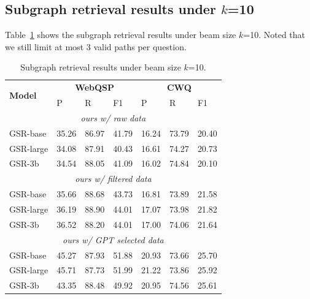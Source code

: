 \documentclass[11pt]{article}
\begin{document}
\subsection{Subgraph retrieval results under $k$=10}
\label{app:top10}
Table~\ref{tab:subgraph_ret_res_top10} shows the subgraph retrieval results under beam size $k$=10. Noted that we still limit at most 3 valid paths per question.
\begin{table}[t]
    \centering
    \small
    \begin{tabular}{l|p{0.5cm}p{0.5cm}p{0.6cm}|p{0.5cm}p{0.5cm}p{0.5cm}}
    \toprule
        \multirow{2}{*}{\bf{Model}} & \multicolumn{3}{c}{\bf{WebQSP}} & \multicolumn{3}{|c}{\bf{CWQ}} \\ 
        & P & R & F1 & P & R & F1 \\ \midrule
        \multicolumn{7}{c}{\textit{ours w/ raw data}} \\ \midrule
        GSR-base & 35.26 & 86.97 & 41.79 & 16.24 & 73.79 & 20.40 \\
        GSR-large & 34.08 & 87.91 & 40.43 & 16.61 & 74.27 & 20.73 \\
        GSR-3b & 34.54 & 88.05 & 41.09 & 16.02 & 74.84 & 20.10 \\ \midrule 
        \multicolumn{7}{c}{\textit{ours w/ filtered data}} \\ \midrule
        GSR-base & 35.66 & 88.68 & 43.73 & 16.81 & 73.89 & 21.58 \\
        GSR-large & 36.19 & 88.90 & 44.01 & 17.07 & 73.98 & 21.82 \\
        GSR-3b & 36.52 & 88.20 & 44.01 & 17.00 & 74.06 & 21.64 \\ 
        \midrule
        \multicolumn{7}{c}{\textit{ours w/ GPT selected data}} \\ \midrule
        GSR-base & 45.27 & 87.93 & 51.88 & 20.93 & 73.66 & 25.70 \\
        GSR-large & 45.71 & 87.73 & 51.99 & 21.22 & 73.86 & 25.92 \\
        GSR-3b & 43.35 & 88.48 & 49.92 & 20.95 & 74.56 & 25.61  \\
        \bottomrule
    \end{tabular}
    \caption{Subgraph retrieval results under beam size $k$=10.}
    \label{tab:subgraph_ret_res_top10}
\end{table}
\end{document}

